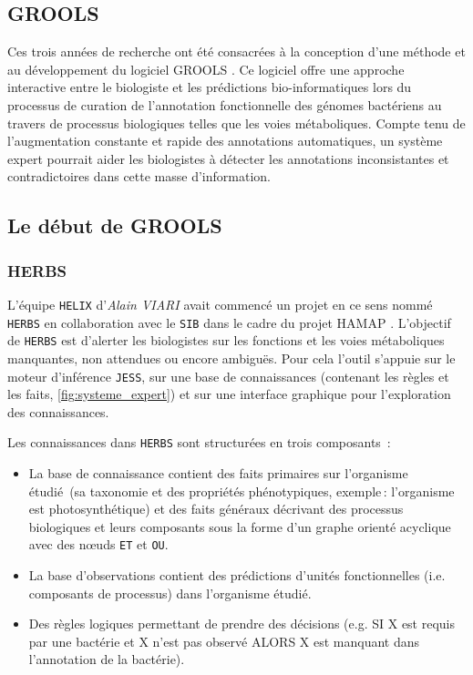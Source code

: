 \begin{refsegment}
\chapter{GROOLS}

Ces trois années de recherche ont été consacrées à la conception d’une méthode et au développement du logiciel \gls{GROOLS} . Ce logiciel offre une approche interactive entre le biologiste et les prédictions bio-informatiques lors du processus de curation de l'annotation fonctionnelle des génomes bactériens au travers de processus biologiques telles que les voies métaboliques. Compte tenu de l'augmentation constante et rapide des annotations automatiques, un système expert pourrait aider les biologistes à détecter les annotations inconsistantes et contradictoires dans cette masse d'information. 

\section{Le début de GROOLS}

\subsection{HERBS}

L'équipe \texttt{HELIX} d'\textit{Alain VIARI} avait commencé un projet en ce sens nommé \texttt{\gls{HERBS}} en collaboration avec le \texttt{\gls{SIB}} dans le cadre du projet \gls{HAMAP} \cite{pedruzzi2015hamap}. L'objectif de \texttt{\gls{HERBS}} est d'alerter les biologistes sur les fonctions et les voies métaboliques manquantes, non attendues ou encore ambiguës. Pour cela l'outil s'appuie sur le moteur d'inférence \texttt{\gls{JESS}}, sur une base de connaissances (contenant les règles et les faits, \cref{fig:systeme_expert}) et sur une interface graphique pour l'exploration des connaissances. 

Les connaissances dans \texttt{HERBS} sont structurées en trois composants :\nolisttopbreak
\begin{itemize}
	\item La base de connaissance contient des faits primaires sur l’organisme étudié (sa taxonomie  et des propriétés phénotypiques, exemple : l’organisme est photosynthétique) et des faits généraux décrivant des processus biologiques et leurs composants sous la forme d’un  graphe orienté acyclique avec des nœuds \texttt{ET} et \texttt{OU}.
	\item La base d’observations contient des prédictions d’unités fonctionnelles (i.e. composants de processus) dans l’organisme étudié.
	\item Des règles logiques permettant de prendre des décisions (e.g. SI X est requis par une bactérie et X n’est pas observé ALORS X est manquant dans l’annotation de la bactérie).
\end{itemize}


\end{refsegment}
